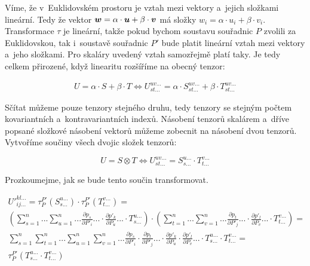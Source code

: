 Víme, že v~Euklidovském prostoru je vztah mezi vektory a~jejich složkami lineární. Tedy že vektor \(\boldsymbol{w} = \alpha \cdot \boldsymbol{u} + \beta \cdot \boldsymbol{v}\) má složky \(w_i = \alpha \cdot u_i + \beta \cdot v_i\). Transformace \(\tau\) je lineární, takže pokud bychom soustavu souřadnic \(P\) zvolili za Euklidovskou, tak i~soustavě souřadnic \(P'\) bude platit lineární vztah mezi vektory a~jeho složkami. Pro skaláry uvedený vztah samozřejmě platí taky. Je tedy celkem přirozené, když linearitu rozšíříme na obecný tenzor:

\begin{equation}
\label{eq:scitani_a_nasobeni_tenzoru}
\begin{split}
U = \alpha \cdot S + \beta \cdot T \Leftrightarrow U_{st...}^{uv...} = \alpha \cdot S_{st...}^{uv...} + \beta \cdot T_{st...}^{uv...}
\end{split}
\end{equation}

Sčítat můžeme pouze tenzory stejného druhu, tedy tenzory se stejným počtem kovariantních a~kontravariantních indexů. Násobení tenzorů skalárem a~dříve popsané složkové násobení vektorů můžeme zobecnit na násobení dvou tenzorů. Vytvoříme součiny všech dvojic složek tenzorů:

\begin{equation}
\label{eq:nasobeni_tenzoru}
U = S \otimes T \Leftrightarrow U_{st...}^{uv...} = S_{s...}^{u...} \cdot T_{t...}^{v...}
\end{equation}

Prozkoumejme, jak se bude tento součin transformovat.

\begin{equation}
\begin{split}
U'^{kl...}_{ij...} = \tau_{P}^{P'}(S_{s...}^{u...}) \cdot \tau_{P}^{P'}(T_{t...}^{v...}) = \\
\left( \sum_{s=1}^n ... \sum_{u=1}^n ... \frac{\partial p_s}{\partial P'_i} ... \cdot \frac{\partial p'_k}{\partial P_u} ... \cdot T_{s...}^{u...} \right) \cdot \left( \sum_{t=1}^n ... \sum_{v=1}^n ... \frac{\partial p_t}{\partial P'_j} ... \cdot \frac{\partial p'_l}{\partial P_v} ... \cdot T_{t...}^{v...} \right) = \\
\sum_{s=1}^n \sum_{t=1}^n ... \sum_{u=1}^n \sum_{v=1}^n ... \frac{\partial p_s}{\partial P'_i} \cdot \frac{\partial p_t}{\partial P'_j} ... \cdot \frac{\partial p'_k}{\partial P_u} \cdot \frac{\partial p'_l}{\partial P_v} ... \cdot T_{s...}^{u...} \cdot T_{t...}^{v...} = \\
\tau_{P}^{P'}(T_{s...}^{u...} \cdot T_{t...}^{v...})
\end{split}
\end{equation}

